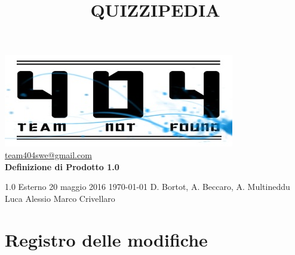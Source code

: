 \documentclass[a4paper,11pt]{article}
\title{\textbf{{\fontsize{8mm}{5mm}\selectfont QUIZZIPEDIA}}}
\date{}
\author{}
\begin{document}
	\maketitle
	\thispagestyle{empty}
	\begin{center}	
	\includegraphics{../team_not_found.jpg}\\
	\fontsize{5mm}{3mm}\url{team404swe@gmail.com}\\
	
	\vspace{50mm}
	\textbf{Definizione di Prodotto 1.0}
	\end{center}
			{1.0} 							%
			{Esterno} 						%
			{20 maggio 2016} 				%
			{\today} 						%
			{D. Bortot, A. Beccaro, A. Multineddu}		%
			{Luca Alessio} 			%
			{Marco Crivellaro} 				%
	\newpage
	\thispagestyle{empty}
	\null  

	\newpage
	\newpage
	\fancyfoot[R]{\thepage}
	
	\hspace{30 mm}
	\section*{Registro delle modifiche}
	
	\beginregistro
	
\end{document}

